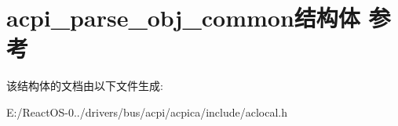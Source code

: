 \hypertarget{structacpi__parse__obj__common}{}\section{acpi\+\_\+parse\+\_\+obj\+\_\+common结构体 参考}
\label{structacpi__parse__obj__common}


该结构体的文档由以下文件生成\+:\begin{DoxyCompactItemize}
\item 
E\+:/\+React\+O\+S-\/0../drivers/bus/acpi/acpica/include/aclocal.\+h\end{DoxyCompactItemize}
